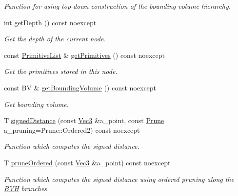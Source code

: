 \begin{DoxyCompactItemize}
\begin{DoxyCompactList}\small\item\em Function for using top-\/down construction of the bounding volume hierarchy. \end{DoxyCompactList}\item 
int \hyperlink{classBVH_1_1NodeT_a158041a671c970da921446050e95f474}{get\+Depth} () const noexcept
\begin{DoxyCompactList}\small\item\em Get the depth of the current node. \end{DoxyCompactList}\item 
const \hyperlink{classBVH_1_1NodeT_a19cce6e7fbe85eccb4a3718dd69f49b7}{Primitive\+List} \& \hyperlink{classBVH_1_1NodeT_a2e0c1e030162a2dc049acb4debd4d9f2}{get\+Primitives} () const noexcept
\begin{DoxyCompactList}\small\item\em Get the primitives stored in this node. \end{DoxyCompactList}\item 
\mbox{\label{classBVH_1_1NodeT_a02cba4dcb065ebfaeea7e4d251b89d04}} 
const BV \& \hyperlink{classBVH_1_1NodeT_a02cba4dcb065ebfaeea7e4d251b89d04}{get\+Bounding\+Volume} () const noexcept
\begin{DoxyCompactList}\small\item\em Get bounding volume. \end{DoxyCompactList}\item 
T \hyperlink{classBVH_1_1NodeT_aef7148b18296dce60853b5966c9f1e0d}{signed\+Distance} (const \hyperlink{classBVH_1_1NodeT_a6fbb4308c5c55ee170c5f992df7ae1d0}{Vec3} \&a\+\_\+point, const \hyperlink{namespaceBVH_a3ddb7b34ac1deb3baed2f32d9eacbe5b}{Prune} a\+\_\+pruning=Prune\+::\+Ordered2) const noexcept
\begin{DoxyCompactList}\small\item\em Function which computes the signed distance. \end{DoxyCompactList}\item 
T \hyperlink{classBVH_1_1NodeT_a3aa6e9109897a573a46714278e0a79c6}{prune\+Ordered} (const \hyperlink{classBVH_1_1NodeT_a6fbb4308c5c55ee170c5f992df7ae1d0}{Vec3} \&a\+\_\+point) const noexcept
\begin{DoxyCompactList}\small\item\em Function which computes the signed distance using ordered pruning along the \hyperlink{namespaceBVH}{B\+VH} branches. \end{DoxyCompactList}\item 

\end{DoxyCompactItemize}
